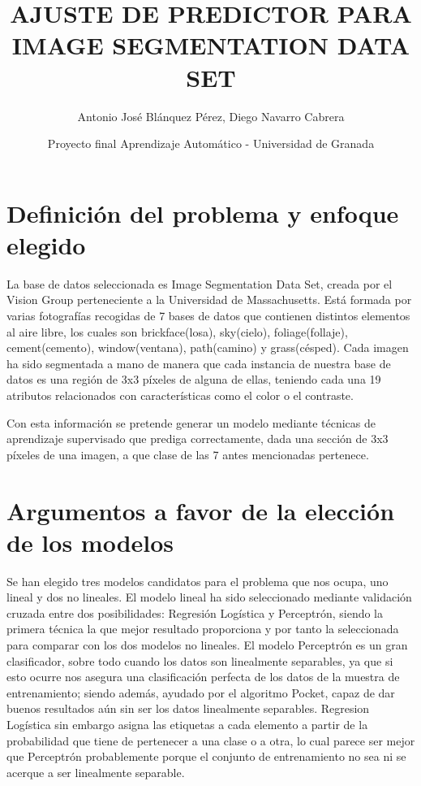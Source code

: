 \documentclass{article}
\title{AJUSTE DE PREDICTOR PARA IMAGE SEGMENTATION DATA SET}
\author{Antonio José Blánquez Pérez, Diego Navarro Cabrera}
\date{Proyecto final Aprendizaje Automático - Universidad de Granada}
\begin{document}
 \setlength{\parskip}{1em} 

	\maketitle
	

	\section{Definición del problema y enfoque elegido}

	La base de datos seleccionada es Image Segmentation Data Set, creada por el Vision Group perteneciente a la Universidad de Massachusetts. Está formada por varias fotografías recogidas de 7 bases de datos que contienen distintos elementos al aire libre, los cuales son brickface(losa), sky(cielo), foliage(follaje), cement(cemento), window(ventana), path(camino) y grass(césped). Cada imagen ha sido segmentada a mano de manera que cada instancia de nuestra base de datos es una región de 3x3 píxeles de alguna de ellas, teniendo cada una 19 atributos relacionados con características como el color o el contraste. 
	\par
	Con esta información se pretende generar un modelo mediante técnicas de aprendizaje supervisado que prediga correctamente, dada una sección de 3x3 píxeles de una imagen, a que clase de las 7 antes mencionadas pertenece.
	
	\section{Argumentos a favor de la elección de los modelos}
	
	Se han elegido tres modelos candidatos para el problema que nos ocupa, uno lineal y dos no lineales. El modelo lineal ha sido seleccionado mediante validación cruzada entre dos posibilidades: Regresión Logística y Perceptrón, siendo la primera técnica la que mejor resultado proporciona y por tanto la seleccionada para comparar con los dos modelos no lineales. El modelo Perceptrón es un gran clasificador, sobre todo cuando los datos son linealmente separables, ya que si esto ocurre nos asegura una clasificación perfecta de los datos de la muestra de entrenamiento; siendo además, ayudado por el algoritmo Pocket, capaz de dar buenos resultados aún sin ser los datos linealmente separables. Regresion Logística sin embargo asigna las etiquetas a cada elemento a partir de la probabilidad que tiene de pertenecer a una clase o a otra, lo cual parece ser mejor que Perceptrón probablemente porque el conjunto de entrenamiento no sea ni se acerque a ser linealmente separable.
		
\end{document}
